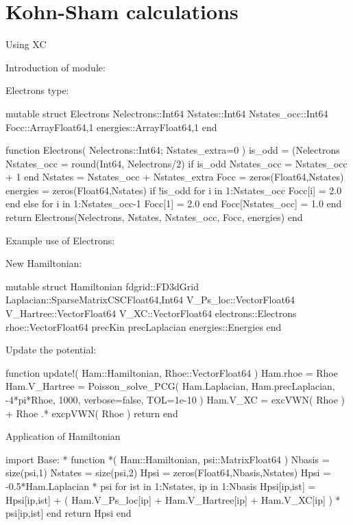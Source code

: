 \section{Kohn-Sham calculations}

Using XC

Introduction of module:

Electrons type:
\begin{juliacode}
mutable struct Electrons
    Nelectrons::Int64
    Nstates::Int64
    Nstates_occ::Int64
    Focc::Array{Float64,1}
    energies::Array{Float64,1}
end
\end{juliacode}

\begin{juliacode}
function Electrons( Nelectrons::Int64; Nstates_extra=0 )
    is_odd = (Nelectrons%
    Nstates_occ = round(Int64, Nelectrons/2)
    if is_odd
        Nstates_occ = Nstates_occ + 1
    end
    Nstates = Nstates_occ + Nstates_extra
    Focc = zeros(Float64,Nstates)
    energies = zeros(Float64,Nstates)
    if !is_odd
        for i in 1:Nstates_occ
           Focc[i] = 2.0 
        end
    else
        for i in 1:Nstates_occ-1
            Focc[1] = 2.0
        end
        Focc[Nstates_occ] = 1.0
    end
    return Electrons(Nelectrons, Nstates, Nstates_occ, Focc, energies)
end
\end{juliacode}

Example use of Electrons:

New Hamiltonian:
\begin{juliacode}
mutable struct Hamiltonian
    fdgrid::FD3dGrid
    Laplacian::SparseMatrixCSC{Float64,Int64}
    V_Ps_loc::Vector{Float64}
    V_Hartree::Vector{Float64}
    V_XC::Vector{Float64}
    electrons::Electrons
    rhoe::Vector{Float64}
    precKin
    precLaplacian
    energies::Energies
end
\end{juliacode}




Update the potential:
\begin{juliacode}
function update!( Ham::Hamiltonian, Rhoe::Vector{Float64} )
    Ham.rhoe = Rhoe
    Ham.V_Hartree = Poisson_solve_PCG( Ham.Laplacian, Ham.precLaplacian, -4*pi*Rhoe, 1000, verbose=false, TOL=1e-10 )
    Ham.V_XC = excVWN( Rhoe ) + Rhoe .* excpVWN( Rhoe )
    return
end
\end{juliacode}

Application of Hamiltonian
\begin{juliacode}
import Base: *
function *( Ham::Hamiltonian, psi::Matrix{Float64} )
    Nbasis = size(psi,1)
    Nstates = size(psi,2)
    Hpsi = zeros(Float64,Nbasis,Nstates)
    Hpsi = -0.5*Ham.Laplacian * psi
    for ist in 1:Nstates, ip in 1:Nbasis
        Hpsi[ip,ist] = Hpsi[ip,ist] + ( Ham.V_Ps_loc[ip] + Ham.V_Hartree[ip] + Ham.V_XC[ip] ) * psi[ip,ist]
    end
    return Hpsi
end
\end{juliacode}